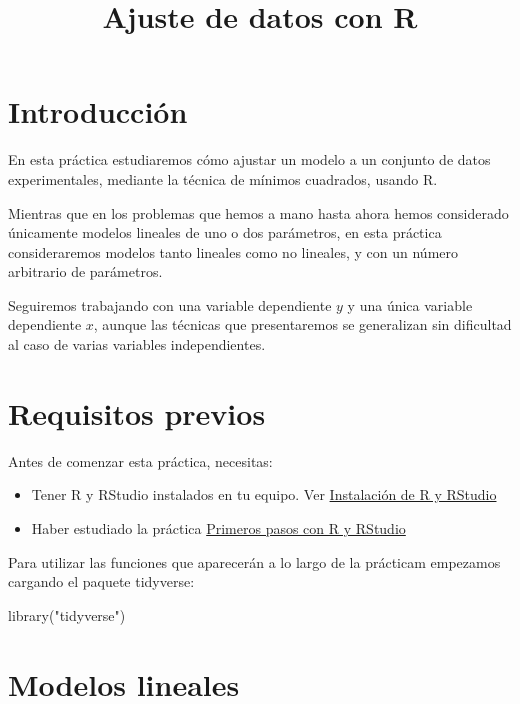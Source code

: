 \documentclass[
  degree=mecinf,
  title=normal,
  toc=normal,
  bib=normal]{mnye}
\title{Ajuste de datos con R}
\newenvironment{Shaded}{\begin{snugshade}}{\end{snugshade}}
\newcommand{\FunctionTok}[1]{\textcolor[rgb]{0.00,0.00,0.00}{#1}}
\newcommand{\NormalTok}[1]{#1}
\newcommand{\StringTok}[1]{\textcolor[rgb]{0.31,0.60,0.02}{#1}}
\begin{document}

\hypertarget{introducciuxf3n}{%
\section*{Introducción}\label{introducciuxf3n}}

En esta práctica estudiaremos cómo ajustar un modelo a un conjunto de datos experimentales, mediante la técnica de mínimos cuadrados, usando \textsf{R}.

Mientras que en los problemas que hemos a mano hasta ahora hemos considerado únicamente modelos lineales de uno o dos parámetros, en esta práctica consideraremos modelos tanto lineales como no lineales, y con un número arbitrario de parámetros.

Seguiremos trabajando con una variable dependiente \(y\) y una única variable dependiente \(x\), aunque las técnicas que presentaremos se generalizan sin dificultad al caso de varias variables independientes.

\hypertarget{requisitos-previos}{%
\section{Requisitos previos}\label{requisitos-previos}}

Antes de comenzar esta práctica, necesitas:

\begin{itemize}
\item
  Tener \textsf{R} y \textsf{RStudio} instalados en tu equipo. Ver \href{https://emazcunan.github.io/install-r-rstudio/}{Instalación de R y RStudio}
\item
  Haber estudiado la práctica \href{https://emazcunan.github.io/basics-r-rstudio/}{Primeros pasos con R y RStudio}
\end{itemize}

Para utilizar las funciones que aparecerán a lo largo de la prácticam empezamos cargando el paquete tidyverse:

\begin{Shaded}
\begin{Highlighting}[]
\FunctionTok{library}\NormalTok{(}\StringTok{"tidyverse"}\NormalTok{)}
\end{Highlighting}
\end{Shaded}

\hypertarget{lm}{%
\section{Modelos lineales}\label{lm}}
\end{document}
